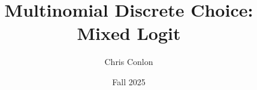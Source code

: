 \documentclass[aspectratio=169,11pt]{beamer}
\title{Multinomial Discrete Choice: Mixed Logit}
\author{Chris Conlon}
\institute{Grad IO}
\date{Fall 2025}
\begin{document}
\frame{\titlepage}

%
\end{document}
